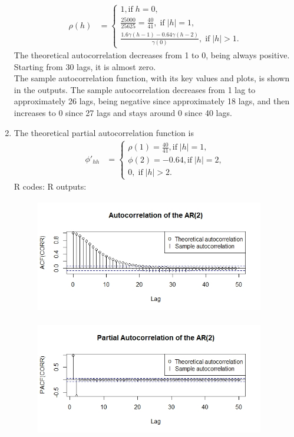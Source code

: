 \documentclass[10pt]{article}
\begin{document}
\begin{enumerate}[1)]
\begin{align*}
\rho(h)&=\left\{\begin{array}{ll}1,\textrm{if}\;h=0,\\
\frac{25000}{25625}=\frac{40}{41},\;\textrm{if}\;|h|=1,\\
\frac{1.6\gamma(h-1)-0.64\gamma(h-2)}{\gamma(0)},\;\textrm{if}\;|h|>1.\end{array}\right.
\end{align*}
The theoretical autocorrelation decreases from 1 to 0, being always positive. Starting from 30 lags, it is almost zero.\\
The sample autocorrelation function, with its key values and plots, is shown in the outputs. The sample autocorrelation decreases from 1 lag to approximately 26 lags, being negative since approximately 18 lags, and then increases to 0 since 27 lags and stays around 0 since 40 lags.

\item
The theoretical partial autocorrelation function is
\begin{align*}
\phi'_{hh}&=\left\{\begin{array}{ll}\rho(1)=\frac{40}{41},\textrm{if}\;|h|=1,\\
\phi(2)=-0.64,\textrm{if}\;|h|=2,\\
0,\;\textrm{if}\;|h|>2.\end{array}\right.
\end{align*}
R codes:
R outputs:

\begin{figure}[H]
  \centering
  \includegraphics[width=10cm,height=5cm]{p33a.jpeg}
\end{figure}
\begin{figure}[H]
  \centering
  \includegraphics[width=10cm,height=5cm]{p33b.jpeg}
\end{figure}


\end{enumerate}
\end{document}
